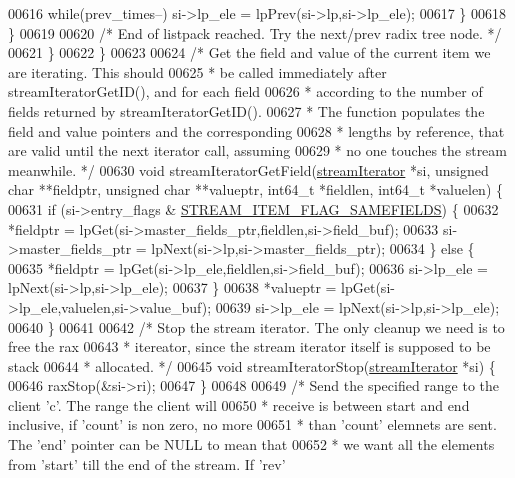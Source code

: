 \begin{DoxyCode}
{00616                 \textcolor{keywordflow}{while}(prev\_times--) si->lp\_ele = lpPrev(si->lp,si->lp\_ele);
00617             \}
00618         \}
00619 
00620         \textcolor{comment}{/* End of listpack reached. Try the next/prev radix tree node. */}
00621     \}
00622 \}
00623 
00624 \textcolor{comment}{/* Get the field and value of the current item we are iterating. This should}
00625 \textcolor{comment}{ * be called immediately after streamIteratorGetID(), and for each field}
00626 \textcolor{comment}{ * according to the number of fields returned by streamIteratorGetID().}
00627 \textcolor{comment}{ * The function populates the field and value pointers and the corresponding}
00628 \textcolor{comment}{ * lengths by reference, that are valid until the next iterator call, assuming}
00629 \textcolor{comment}{ * no one touches the stream meanwhile. */}
00630 \textcolor{keywordtype}{void} streamIteratorGetField(\hyperlink{structstreamIterator}{streamIterator} *si, \textcolor{keywordtype}{unsigned} \textcolor{keywordtype}{char} **fieldptr, \textcolor{keywordtype}{unsigned} \textcolor{keywordtype}{char} 
      **valueptr, int64\_t *fieldlen, int64\_t *valuelen) \{
00631     \textcolor{keywordflow}{if} (si->entry\_flags & \hyperlink{t__stream_8c_a6977b456a646762a7650d432a06dc6c5}{STREAM\_ITEM\_FLAG\_SAMEFIELDS}) \{
00632         *fieldptr = lpGet(si->master\_fields\_ptr,fieldlen,si->field\_buf);
00633         si->master\_fields\_ptr = lpNext(si->lp,si->master\_fields\_ptr);
00634     \} \textcolor{keywordflow}{else} \{
00635         *fieldptr = lpGet(si->lp\_ele,fieldlen,si->field\_buf);
00636         si->lp\_ele = lpNext(si->lp,si->lp\_ele);
00637     \}
00638     *valueptr = lpGet(si->lp\_ele,valuelen,si->value\_buf);
00639     si->lp\_ele = lpNext(si->lp,si->lp\_ele);
00640 \}
00641 
00642 \textcolor{comment}{/* Stop the stream iterator. The only cleanup we need is to free the rax}
00643 \textcolor{comment}{ * itereator, since the stream iterator itself is supposed to be stack}
00644 \textcolor{comment}{ * allocated. */}
00645 \textcolor{keywordtype}{void} streamIteratorStop(\hyperlink{structstreamIterator}{streamIterator} *si) \{
00646     raxStop(&si->ri);
00647 \}
00648 
00649 \textcolor{comment}{/* Send the specified range to the client 'c'. The range the client will}
00650 \textcolor{comment}{ * receive is between start and end inclusive, if 'count' is non zero, no more}
00651 \textcolor{comment}{ * than 'count' elemnets are sent. The 'end' pointer can be NULL to mean that}
00652 \textcolor{comment}{ * we want all the elements from 'start' till the end of the stream. If 'rev'}
}
\end{DoxyCode}
